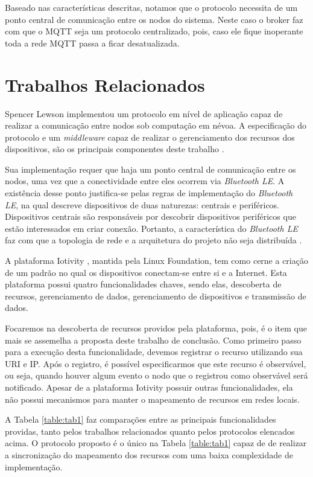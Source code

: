 Baseado nas características descritas, notamos que o protocolo necessita de um ponto central de comunicação entre os nodos do sistema.
Neste caso o broker faz com que o MQTT seja um protocolo centralizado, pois, caso ele fique inoperante toda a rede MQTT passa a ficar desatualizada.

\section{Trabalhos Relacionados}

Spencer Lewson implementou um protocolo em nível de aplicação \cite{tanenbaum2011redes} capaz de realizar a comunicação entre nodos sob computação em névoa.
A especificação do protocolo e um \textit{middleware} capaz de realizar o gerenciamento dos recursos dos dispositivos, são os principais componentes deste trabalho \cite{Spencer:2015}.

Sua implementação requer que haja um ponto central de comunicação entre os nodos, uma vez que a conectividade entre eles ocorrem via \textit{Bluetooth LE}.
A existência desse ponto justifica-se pelas regras de implementação do \textit{Bluetooth LE}, na qual descreve dispositivos de duas naturezas: centrais e periféricos.
Dispositivos centrais são responsáveis por descobrir dispositivos periféricos que estão interessados em criar conexão.
Portanto, a característica do \textit{Bluetooth LE} faz com que a topologia de rede e a arquitetura do projeto não seja distribuída \cite{Spencer:2015}.

A plataforma Iotivity \cite{iotivity}, mantida pela Linux Foundation, tem como cerne a criação de um padrão no qual os dispositivos conectam-se entre si e a Internet.
Esta plataforma possui quatro funcionalidades chaves, sendo elas, descoberta de recursos, gerenciamento de dados, gerenciamento de dispositivos e transmissão de dados.

Focaremos na descoberta de recursos providos pela plataforma, pois, é o item que mais se assemelha a proposta deste trabalho de conclusão.
Como primeiro passo para a execução desta funcionalidade, devemos registrar o recurso utilizando sua URI e IP.
Após o registro, é possível especificarmos que este recurso é observável, ou seja, quando houver algum evento o nodo que o registrou como observável será notificado.
Apesar de a plataforma Iotivity possuir outras funcionalidades, ela não possui mecanismos para manter o mapeamento de recursos em redes locais.

A Tabela \ref{table:tab1} faz comparações entre as principais funcionalidades providas, tanto pelos trabalhos relacionados quanto pelos protocolos elencados acima.
O protocolo proposto é o único na Tabela \ref{table:tab1} capaz de de realizar a sincronização do mapeamento dos recursos com uma baixa complexidade de implementação.


